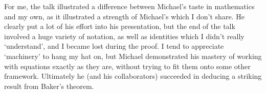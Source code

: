 \documentclass[11pt, leqno]{article}
\begin{document}
For me, the talk illustrated a difference between Michael's taste in mathematics and my own, as it illustrated a strength of Michael's which I don't share. He clearly put a lot of
his effort into his presentation, but the end of the talk involved a huge variety of notation, as well as identities which I didn't really `understand', and I became lost during the proof.
I tend to appreciate `machinery' to hang my hat on, but Michael demonstrated his mastery of working with equations exactly as they are, without trying to fit them onto
some other framework. Ultimately he (and his collaborators) succeeded in deducing a striking result from Baker's theorem.
\end{document}
